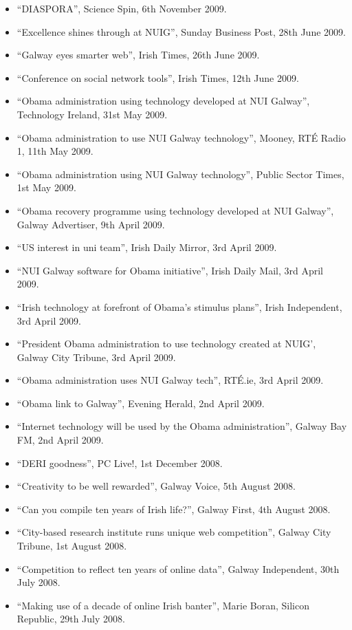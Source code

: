 \documentclass[10pt,a4paper]{res} %
\begin{document}
\begin{resume}
{\begin{itemize}
\item ``DIASPORA'', Science Spin, 6th November 2009.
\item ``Excellence shines through at NUIG'', Sunday Business Post, 28th June 2009.
\item ``Galway eyes smarter web'', Irish Times, 26th June 2009.
\item ``Conference on social network tools'', Irish Times, 12th June 2009.
\item ``Obama administration using technology developed at NUI Galway'', Technology Ireland, 31st May 2009.
\item ``Obama administration to use NUI Galway technology'', Mooney, RT\'{E} Radio 1, 11th May 2009.
\item ``Obama administration using NUI Galway technology'', Public Sector Times, 1st May 2009.
\item ``Obama recovery programme using technology developed at NUI Galway'', Galway Advertiser, 9th April 2009.
\item ``US interest in uni team'', Irish Daily Mirror, 3rd April 2009.
\item ``NUI Galway software for Obama initiative'', Irish Daily Mail, 3rd April 2009.
\item ``Irish technology at forefront of Obama's stimulus plans'', Irish Independent, 3rd April 2009.
\item ``President Obama administration to use technology created at NUIG', Galway City Tribune, 3rd April 2009.
\item ``Obama administration uses NUI Galway tech'', RT\'{E}.ie, 3rd April 2009.
\item ``Obama link to Galway'', Evening Herald, 2nd April 2009.
\item ``Internet technology will be used by the Obama administration'', Galway Bay FM, 2nd April 2009.
\item ``DERI goodness'', PC Live!, 1st December 2008.
\item ``Creativity to be well rewarded'', Galway Voice, 5th August 2008.
\item ``Can you compile ten years of Irish life?'', Galway First, 4th August 2008.
\item ``City-based research institute runs unique web competition'', Galway City Tribune, 1st August 2008.
\item ``Competition to reflect ten years of online data'', Galway Independent, 30th July 2008.
\item ``Making use of a decade of online Irish banter'', Marie Boran, Silicon Republic, 29th July 2008.

\end{itemize}}
\end{resume}
\end{document}
